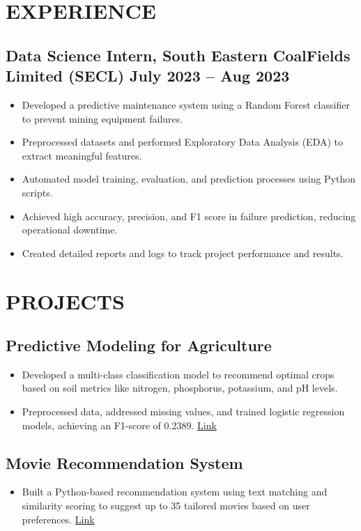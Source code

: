 \documentclass[a4paper,11pt]{article}
\begin{document}
\section*{EXPERIENCE}
\subsection{{Data Science Intern, South Eastern CoalFields Limited (SECL)} \small\hfill July 2023 – Aug 2023}
\begin{itemize}
    \item Developed a predictive maintenance system using a Random Forest classifier to prevent mining equipment failures.
    \item Preprocessed datasets and performed Exploratory Data Analysis (EDA) to extract meaningful features.
    \item Automated model training, evaluation, and prediction processes using Python scripts.
    \item Achieved high accuracy, precision, and F1 score in failure prediction, reducing operational downtime.
    \item Created detailed reports and logs to track project performance and results.
\end{itemize}

\section*{PROJECTS}

\subsection{{Predictive Modeling for Agriculture} }
\begin{itemize}
    \item Developed a multi-class classification model to recommend optimal crops based on soil metrics like nitrogen, phosphorus, potassium, and pH levels.
    \item Preprocessed data, addressed missing values, and trained logistic regression models, achieving an F1-score of 0.2389. \href{https://github.com/anoushkaacc/Machine-Learning-fundamentals-with-Python/tree/main/Project%3A%20Predictive%20Modeling%20for%20Agriculture}{Link}
\end{itemize}

\subsection{Movie Recommendation System}
\begin{itemize}
    \item Built a Python-based recommendation system using text matching and similarity scoring to suggest up to 35 tailored movies based on user preferences. \href{https://github.com/anoushkaacc/Acmegrade-projects/tree/main/Movie%20Recommendation%20engine}{Link}
\end{itemize}
\end{document}
